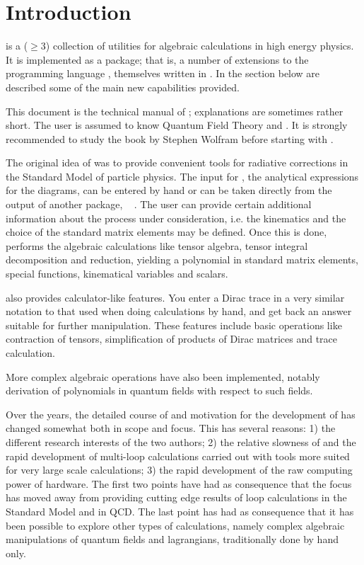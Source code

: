 \section{Introduction}

\fc is a ($\ge 3$) collection of utilities for algebraic calculations in 
high energy physics. It is implemented as a \mma package; that is,
a number of extensions to the programming language \mma,
themselves written in \mma. In the section below are described some of the main new
capabilities provided.

This document is the technical manual of \fc; explanations are sometimes rather short.
The user is assumed to know Quantum Field Theory and \mma.
It is strongly recommended to study the \mma book \cite{Mathematica} by
Stephen Wolfram before starting with \fc.

The original idea of \fc was to provide convenient tools 
for radiative corrections in the Standard Model of particle physics. 
The input for \fc, the analytical expressions for the diagrams, can be 
entered by hand or can be taken directly from the output of another 
package, \fa\ \cite{feynarts} .
The user can provide certain additional  information about the process 
under consideration, i.e. the kinematics and the choice of the standard 
matrix elements may be defined. Once this is done, \fc performs the 
algebraic calculations like tensor algebra, tensor integral decomposition and reduction,
yielding a polynomial in standard matrix elements,  special functions, kinematical 
variables and scalars.

\fc also provides calculator-like features. You enter a Dirac trace 
in a very similar notation to that used when doing calculations by hand, and 
get back an answer suitable 
for further manipulation. These features include basic operations like contraction of
tensors, simplification of products of Dirac matrices and trace calculation.

More complex algebraic operations have also been implemented, notably derivation
of polynomials in quantum fields with respect to such fields.

Over the years, the detailed course of and motivation for the development of \fc has
changed somewhat both in scope and focus. This has several reasons: 1) the different research
interests of the two authors; 2) the relative slowness of \mma and the rapid development of
multi-loop calculations carried out with tools more suited for very large scale calculations;
3) the rapid development of the raw computing power of hardware. The first two points have had as consequence that the focus has moved away from providing cutting edge results of loop calculations
in the Standard Model and in QCD. The last point has had as consequence that it has been possible
to explore other types of calculations, namely complex algebraic manipulations of quantum fields
and lagrangians, traditionally done by hand only.

